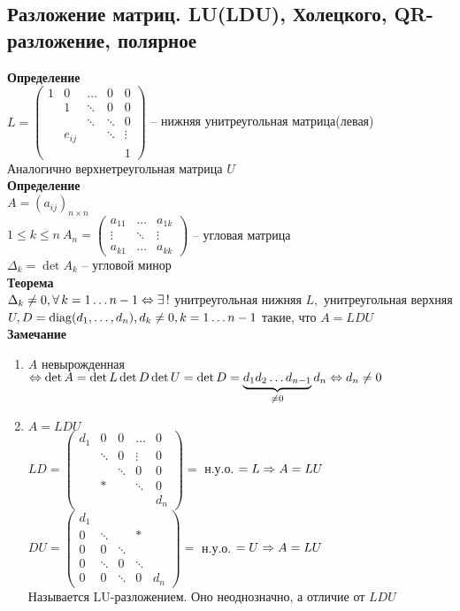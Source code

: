 \documentclass[12pt]{article}
\begin{document}
\subsection{Разложение матриц. LU(LDU), Холецкого, QR-разложение, полярное}
\textbf{Определение}\\
$L = \begin{pmatrix}
    1 & 0 & \ldots & 0 & 0\\
    & 1 & \ddots & 0 & 0\\
    & & \ddots & \ddots & 0\\
    & e_{ij} & & \ddots & \vdots\\
    & & & & 1
\end{pmatrix}$ -- нижняя унитреугольная матрица(левая)\\
Аналогично верхнетреугольная матрица $U$\\
\textbf{Определение}\\
$A = (a_{ij})_{n\times n}$\\
$1 \leq k \leq n\ A_n = \begin{pmatrix}
    a_{11} & \ldots & a_{1k}\\
    \vdots & \ddots & \vdots\\
    a_{k1} & \ldots & a_{kk}
\end{pmatrix}$ -- угловая матрица\\
$\Delta_k = \det A_k$ -- угловой минор\\
\textbf{Теорема}\\
$\Delta_k \neq 0, \fall k=1\ldots n-1 \LRto \ex!$ унитреугольная нижняя $L, $ унитреугольная верхняя $U, D = \nm{diag}(d_1, \ldots, d_n), d_k\neq 0, k=1\ldots n-1$ такие, что $A = LDU$\\
\textbf{Замечание}
\begin{enumerate}
    \item $A$ невырожденная $\LRto \det A = \det L \det D \det U = \det D = \ub{\neq 0}{d_1d_2\ldots d_{n-1}} d_n \LRto d_n \neq 0$
    \item $A=LDU$\\
    $LD = \begin{pmatrix}
        d_1 & 0 & 0 & \ldots & 0\\
        & \ddots & 0 &\vdots & 0\\
        & & \ddots & 0 & 0\\
        & * & & \ddots & 0\\
        & & & & d_n
    \end{pmatrix} = $ н.у.о. $= L \Rto A = LU$\\
    $DU = \begin{pmatrix}
        d_1 & & & &\\
        0 & \ddots & & * &\\
        0 & 0 & \ddots & &\\
        0 & \ddots & 0 & \ddots &\\
        0 & 0 & \ddots & 0 & d_n
    \end{pmatrix} = $ н.у.о. $= U \Rto A = LU$\\
    Называется LU-разложением. Оно неоднозначно, а отличие от $LDU$
\end{enumerate}
\end{document}
